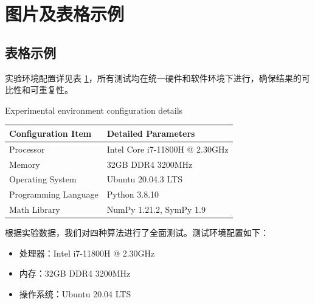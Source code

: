 
\section{图片及表格示例}

\subsection{表格示例}

实验环境配置详见表 \ref{tab:experiment_environment}，所有测试均在统一硬件和软件环境下进行，确保结果的可比性和可重复性。

\begin{table}[htbp]
	
	\centering %
	{Experimental environment configuration details} %
	\label{tab:experiment_environment} %
	
	\begin{tabular}{ll} %
		\toprule %
		\textbf{Configuration Item} & \textbf{Detailed Parameters} \\ %
		\midrule %
		Processor & Intel Core i7-11800H @ 2.30GHz \\
		Memory & 32GB DDR4 3200MHz \\
		Operating System & Ubuntu 20.04.3 LTS \\
		Programming Language & Python 3.8.10 \\
		Math Library & NumPy 1.21.2, SymPy 1.9 \\
		\bottomrule %
	\end{tabular}
\end{table}

根据实验数据，我们对四种算法进行了全面测试。测试环境配置如下：
\begin{itemize}
	\item 处理器：Intel i7-11800H @ 2.30GHz
	\item 内存：32GB DDR4 3200MHz
	\item 操作系统：Ubuntu 20.04 LTS
\end{itemize}

